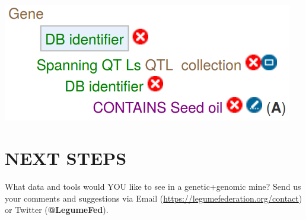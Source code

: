 \documentclass[]{pagposter}
\begin{document}
\begin{multicols*}{3}
\begin{center}
{    }
    \vspace{24pt}
    \includegraphics[width=5in]{gene-seed-oil-query.png} %
  \end{center}


  \section*{NEXT STEPS}

  What data and tools would YOU like to see in a genetic+genomic mine? Send us your comments and suggestions via Email (\url{https://legumefederation.org/contact}) or Twitter (\textbf{@LegumeFed}).






\end{multicols*}
\end{document}
